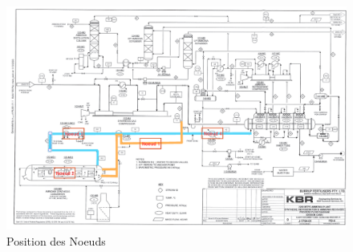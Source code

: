 \begin{figure}[h]
	\begin{center}
	\includegraphics[scale=0.4]{task4/Position_des_differents_noeuds.png} 
	\end{center}
	\caption{Position des  Noeuds}
	\label{cir4}	
\end{figure}


